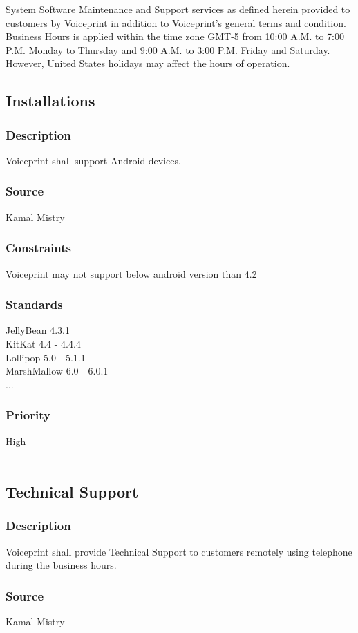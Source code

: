 System Software Maintenance and Support services as defined herein provided to customers by Voiceprint in addition to Voiceprint's general terms and condition. Business Hours is applied within the time zone GMT-5 from 10:00 A.M. to 7:00 P.M. Monday to Thursday and 9:00 A.M. to 3:00 P.M. Friday and Saturday. However, United States holidays may affect the hours of operation.


\subsection{Installations}
\subsubsection{Description}
Voiceprint shall support Android devices.
\subsubsection{Source}
Kamal Mistry
\subsubsection{Constraints}
Voiceprint may not support below android version than 4.2 
\subsubsection{Standards}
JellyBean 4.3.1 \\
KitKat 4.4 - 4.4.4 \\
Lollipop 5.0 - 5.1.1 \\
MarshMallow 6.0 - 6.0.1 \\
...
\subsubsection{Priority}
High
\\
\\
\subsection{Technical Support}
\subsubsection{Description}
Voiceprint shall provide Technical Support to customers remotely using telephone during the business hours.
\subsubsection{Source}
Kamal Mistry
